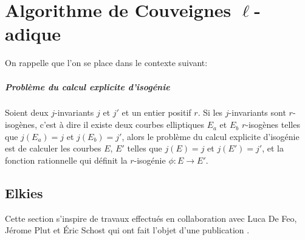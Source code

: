 \documentclass[10pt,a4paper]{book}
\theoremstyle{plain}
\theoremstyle{definition}
\theoremstyle{definition}
\theoremstyle{definition}
\theoremstyle{definition}
\theoremstyle{remark}
\theoremstyle{remark}
\theoremstyle{definition}
\begin{document}
\chapter{Algorithme de Couveignes $\ell$-adique}
\label{cha:alg:fin}
On rappelle que l'on se place dans le contexte suivant:

\paragraph{Problème du calcul explicite d'isogénie} \label{prob:isogeny-problem}

Soient deux $j$-invariants $j$ et $j'$ et un entier positif $r$. Si les $j$-invariants sont $r$-isogènes, c'est à dire il existe deux courbes elliptiques $E_a$ et $E_b$ $r$-isogènes telles que $j(E_a)=j$ et $j(E_b)=j'$, alors le problème du calcul explicite d'isogénie est de calculer les courbes $E$, $E'$ telles que $j(E)=j$ et $j(E')=j'$, et la fonction rationnelle qui définit la $r$-isogénie $\phi:E \rightarrow E'$.

\section{Elkies}
\label{sec:cou:elk}
Cette section s'inspire de travaux effectués en collaboration avec Luca De Feo, J\'erome Plut et \'Eric Schost qui ont fait l'objet d'une publication \cite{Defeo_Plut_Schost_2016}.
\end{document}
